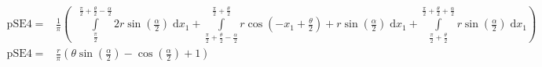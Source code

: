 \begin{align}
    \mathrm{pSE4} =&\frac{1}{\pi} \left(\;\;\int\limits_{\frac{\pi}{2}}^{\frac{\pi}{2} + \frac{\theta}{2} - \frac{\alpha}{2}}2 r \sin{\left (\frac{\alpha}{2} \right )}\;\mathrm{d}x_{1}+\int\limits_{\frac{\pi}{2} + \frac{\theta}{2} - \frac{\alpha}{2}}^{\frac{\pi}{2} + \frac{\theta}{2}}r \cos{\left (- x_{1} + \frac{\theta}{2} \right )} + r \sin{\left (\frac{\alpha}{2} \right )}\;\mathrm{d}x_{1}+\int\limits_{\frac{\pi}{2} + \frac{\theta}{2}}^{\frac{\pi}{2} + \frac{\theta}{2} + \frac{\alpha}{2}}r \sin{\left (\frac{\alpha}{2} \right )}\;\mathrm{d}x_{1}\right)\label{pSE4Def}\\
    \mathrm{pSE4} =& \frac{r}{\pi} \left(\theta \sin{\left (\frac{\alpha}{2} \right )} - \cos{\left (\frac{\alpha}{2} \right )} + 1\right)\label{pSE4Sln}
\end{align}